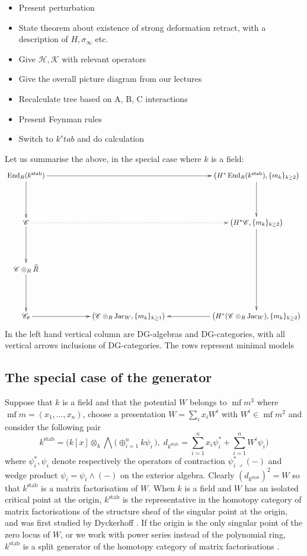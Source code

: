 \documentclass[english,letter paper,12pt,leqno]{article}
\theoremstyle{example}
\numberwithin{equation}{section}
\def\stab{\operatorname{stab}}
\def\jac{\operatorname{Jac}_W}
\DeclareMathOperator{\End}{End}
\DeclareMathOperator{\mf}{mf}
\begin{document}
\begin{itemize}
\item Present perturbation
\item State theorem about existence of strong deformation retract, with a description of $H, \sigma_\infty$ etc.
\item Give $\mathscr{H}, \mathscr{K}$ with relevant operators
\item Give the overall picture diagram from our lectures
\item Recalculate tree based on A, B, C interactions
\item Present Feynman rules
\item Switch to $k^stab$ and do calculation
\end{itemize}

\newpage

Let us summarise the above, in the special case where $k$ is a field:
\[
\xymatrix@C+3pc@R+2pc{
\End_R(k^{\stab}) \ar[d] \ar[rr] & & \big( H^*\End_R(k^{\stab}), \{ m_k \}_{k \ge 2} \big) \ar[d]\\
\mathscr{C} \ar[d] \ar@{.>}[rr] & & \big( H^*\mathscr{C}, \{ m_k \}_{k \ge 2} \big) \ar[dd]\\
\mathscr{C} \otimes_R \widehat{R} \ar[d]\\
\mathscr{C}_\theta \ar[r] & \big( \mathscr{C} \otimes_R \jac, \{ m_k \}_{k \ge 1} \big) & \big( H^*( \mathscr{C} \otimes_R \jac ), \{ m_k \}_{k \ge 2} \big) \ar[l]
}
\]
In the left hand vertical column are DG-algebras and DG-categories, with all vertical arrows inclusions of DG-categories. The rows represent minimal models

\newpage

\subsection{The special case of the generator}

Suppose that $k$ is a field and that the potential $W$ belongs to $\mf{m}^3$ where $\mf{m} = (x_1,\ldots,x_n)$, choose a presentation $W = \sum_i x_i W^i$ with $W^i \in \mf{m}^2$ and consider the following pair
\begin{equation}\label{eq:kstab}
k^{\operatorname{stab}} = \Big( k[x] \otimes_k \bigwedge\big( \oplus_{i=1}^n k\psi_i \,\big), \;d_{k^{\stab}} = \sum_{i=1}^n x_i \psi_i^* + \sum_{i=1}^n W^i \psi_i \Big)
\end{equation}
where $\psi_i^*, \psi_i$ denote respectively the operators of contraction $\psi_i^* \lrcorner (-)$ and wedge product $\psi_i = \psi_i \wedge (-)$ on the exterior algebra. Clearly $(d_{k^{\stab}})^2 = W$ so that $k^{\stab}$ is a matrix factorisation of $W$. When $k$ is a field and $W$ has an isolated critical point at the origin, $k^{\stab}$ is the representative in the homotopy category of matrix factorisations of the structure sheaf of the singular point at the origin, and was first studied by Dyckerhoff \cite{d0904.4713}. If the origin is the only singular point of the zero locus of $W$, or we work with power series instead of the polynomial ring, $k^{\stab}$ is a split generator of the homotopy category of matrix factorisations \cite[Theorem ?]{?}.
\end{document}
